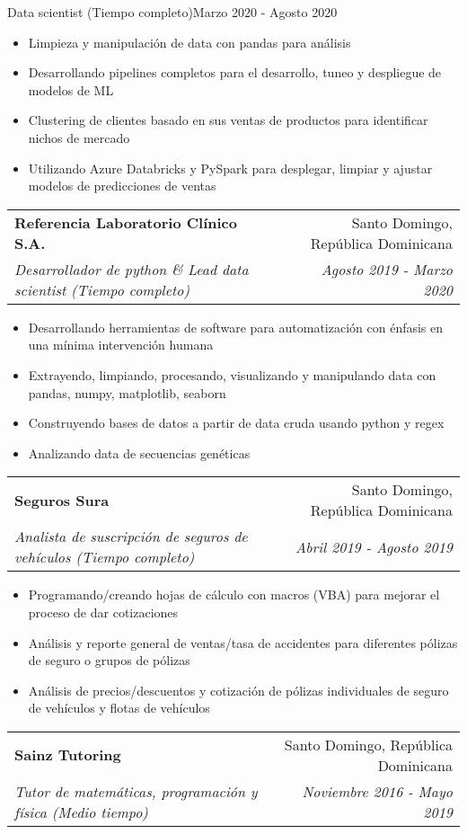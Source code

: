 \documentclass[a4paper,20pt]{article}
\makeatletter
\newcommand{\resumeSubheading}[4]{
  \vspace{-1pt}\item
    \begin{tabular*}{0.97\textwidth}{l@{\extracolsep{\fill}}r}
      \textbf{#1} & #2 \\
      \textit{#3} & \textit{#4} \\
    \end{tabular*}\vspace{-5pt}
}
\makeatother
\begin{document}
    {Data scientist (Tiempo completo)}{Marzo 2020 - Agosto 2020}
\begin{itemize} \itemsep-0.24em
  \item Limpieza y manipulación de data con pandas para análisis
  \item Desarrollando pipelines completos para el desarrollo, tuneo y despliegue de modelos de ML
  \item Clustering de clientes basado en sus ventas de productos para identificar nichos de mercado
  \item Utilizando Azure Databricks y PySpark para desplegar, limpiar y ajustar modelos de predicciones de ventas
\end{itemize}
\vspace{-3pt}
  \resumeSubheading{Referencia Laboratorio Clínico S.A.}{Santo Domingo, República Dominicana}
    {Desarrollador de python \& Lead data scientist (Tiempo completo)}{Agosto 2019 - Marzo 2020}
\begin{itemize} \itemsep-0.24em
  \item Desarrollando herramientas de software para automatización con énfasis en una mínima intervención humana
  \item Extrayendo, limpiando, procesando, visualizando y manipulando data con pandas, numpy, matplotlib, seaborn
  \item Construyendo bases de datos a partir de data cruda usando python y regex
  \item Analizando data de secuencias genéticas
\end{itemize}
\vspace{-3pt}
  \resumeSubheading{Seguros Sura}{Santo Domingo, República Dominicana}
    {Analista de suscripción de seguros de vehículos (Tiempo completo)}{Abril 2019 - Agosto 2019}
\begin{itemize} \itemsep-0.24em
  \item Programando/creando hojas de cálculo con macros (VBA) para mejorar el proceso de dar cotizaciones
  \item Análisis y reporte general de ventas/tasa de accidentes para diferentes pólizas de seguro o grupos de pólizas
  \item Análisis de precios/descuentos y cotización de pólizas individuales de seguro de vehículos y flotas de vehículos
\end{itemize}
\vspace{-3pt}
  \resumeSubheading{Sainz Tutoring}{Santo Domingo, República Dominicana}
    {Tutor de matemáticas, programación y física (Medio tiempo)}{Noviembre 2016 - Mayo 2019}
\end{document}
